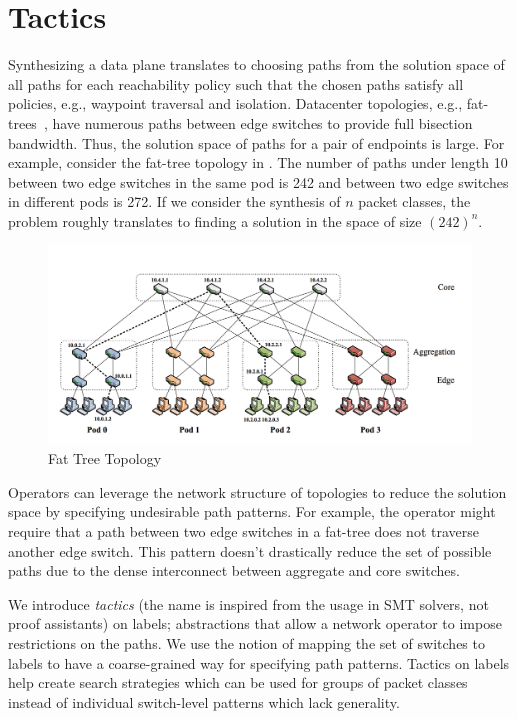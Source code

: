 \section{Tactics} \label{sec:tactic}
Synthesizing a data plane translates to choosing paths from
the solution space of all paths for each reachability policy such
that the chosen paths satisfy all policies, e.g., waypoint traversal
and isolation. Datacenter topologies, e.g., fat-trees~\cite{fattree},
have numerous paths between edge switches to provide full bisection
bandwidth.  Thus, the solution space of paths for a pair of endpoints
is large.  For example, consider the fat-tree topology in
.  The number of paths under length 10 between two
edge switches in the same pod is 242 and between two edge switches in
different pods is 272.  If we consider the synthesis of $n$ packet
classes, the problem roughly translates to finding a solution in the
space of size $(242)^n$.
\begin{figure}[h]
	\includegraphics[width=\columnwidth]{figures/fattree.png}
	\caption{Fat Tree Topology}
	\label{fig:fattree}
\end{figure}
Operators can leverage the network structure of topologies to reduce
the solution space by specifying undesirable path patterns.  For
example, the operator might require that a path between two edge switches in a
fat-tree does not traverse another edge switch.  This pattern doesn't
drastically reduce the set of possible paths due to the dense
interconnect between aggregate and core switches. 

We introduce \emph{tactics} (the name is inspired from the usage in SMT solvers, not 
proof assistants)
on labels; abstractions that allow a
network operator to impose restrictions on the paths. 
We use the notion of mapping the set of switches to labels to 
have a coarse-grained way for specifying path patterns. Tactics on labels 
help create search strategies which can be used for groups
of packet classes instead of individual switch-level patterns which
lack generality.

